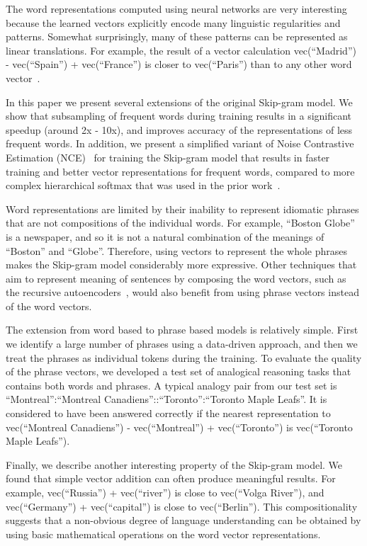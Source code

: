 \documentclass{article}
\begin{document}
The word representations computed using neural networks are
very interesting because the learned vectors explicitly
encode many linguistic regularities and patterns.
Somewhat surprisingly, many of these patterns can be represented
as linear translations.
For example, the result of a vector calculation
vec(``Madrid'') - vec(``Spain'') + vec(``France'') is closer to
vec(``Paris'') than to any other word vector~\cite{linreg,mikolov}.

In this paper we present several extensions of the
original Skip-gram model. We show that subsampling of frequent
words during training results in a significant speedup (around 2x - 10x), and improves
accuracy of the representations of less frequent words.
In addition, we present a simplified variant of Noise Contrastive
Estimation (NCE)~\cite{nce} for training the Skip-gram model that
results in faster training and better vector representations for
frequent words, compared to more complex hierarchical softmax that
was used in the prior work~\cite{mikolov}.

Word representations are limited by their inability to
represent idiomatic phrases that are not compositions of the individual
words. For example, ``Boston Globe'' is a newspaper, and so it is not a
natural combination of the meanings of ``Boston'' and ``Globe''.
Therefore, using vectors to represent
the whole phrases makes the Skip-gram model considerably more
expressive. Other techniques that aim to represent meaning of sentences
by composing the word vectors, such as the
recursive autoencoders~\cite{socher}, would also benefit from using
phrase vectors instead of the word vectors.

The extension from word based to phrase based models is relatively simple.
First we identify a large number of
phrases using a data-driven approach, and then we treat the phrases as
individual tokens during the training. To evaluate the quality of the
phrase vectors, we developed a test set of analogical reasoning tasks that
contains both words and phrases. A typical analogy pair from our test set
is ``Montreal'':``Montreal Canadiens''::``Toronto'':``Toronto Maple Leafs''.
It is considered to have been answered correctly if the
nearest representation to vec(``Montreal Canadiens'') - vec(``Montreal'')
+ vec(``Toronto'') is vec(``Toronto Maple Leafs'').

Finally, we describe another interesting property of the Skip-gram
model. We found that simple vector addition can often produce meaningful
results. For example, vec(``Russia'') + vec(``river'')
is close to vec(``Volga River''), and
vec(``Germany'') + vec(``capital'') is close to vec(``Berlin'').
This compositionality suggests that a non-obvious degree of
language understanding can be obtained by using basic mathematical 
operations on the word vector representations. 
\end{document}
